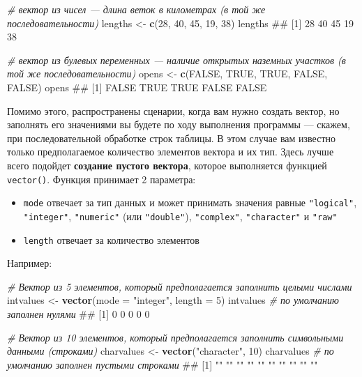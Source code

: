 \documentclass[]{book}
\newenvironment{Shaded}{\begin{snugshade}}{\end{snugshade}}
\newcommand{\KeywordTok}[1]{\textcolor[rgb]{0.13,0.29,0.53}{\textbf{#1}}}
\newcommand{\DataTypeTok}[1]{\textcolor[rgb]{0.13,0.29,0.53}{#1}}
\newcommand{\DecValTok}[1]{\textcolor[rgb]{0.00,0.00,0.81}{#1}}
\newcommand{\StringTok}[1]{\textcolor[rgb]{0.31,0.60,0.02}{#1}}
\newcommand{\CommentTok}[1]{\textcolor[rgb]{0.56,0.35,0.01}{\textit{#1}}}
\newcommand{\OtherTok}[1]{\textcolor[rgb]{0.56,0.35,0.01}{#1}}
\newcommand{\NormalTok}[1]{#1}
\providecommand{\tightlist}{%
  \setlength{\itemsep}{0pt}\setlength{\parskip}{0pt}}
\begin{document}
\begin{Shaded}
\begin{Highlighting}[]
\CommentTok{# вектор из чисел — длина веток в километрах (в той же последовательности)}
\NormalTok{lengths <-}\StringTok{ }\KeywordTok{c}\NormalTok{(}\DecValTok{28}\NormalTok{, }\DecValTok{40}\NormalTok{, }\DecValTok{45}\NormalTok{, }\DecValTok{19}\NormalTok{, }\DecValTok{38}\NormalTok{)}
\NormalTok{lengths}
\NormalTok{## [1] 28 40 45 19 38}
\end{Highlighting}
\end{Shaded}

\begin{Shaded}
\begin{Highlighting}[]
\CommentTok{# вектор из булевых переменных — наличие  открытых наземных участков (в той же последовательности)}
\NormalTok{opens <-}\StringTok{ }\KeywordTok{c}\NormalTok{(}\OtherTok{FALSE}\NormalTok{, }\OtherTok{TRUE}\NormalTok{, }\OtherTok{TRUE}\NormalTok{, }\OtherTok{FALSE}\NormalTok{, }\OtherTok{FALSE}\NormalTok{)}
\NormalTok{opens}
\NormalTok{## [1] FALSE  TRUE  TRUE FALSE FALSE}
\end{Highlighting}
\end{Shaded}

Помимо этого, распространены сценарии, когда вам нужно создать вектор,
но заполнять его значениями вы будете по ходу выполнения программы ---
скажем, при последовательной обработке строк таблицы. В этом случае вам
известно только предполагаемое количество элементов вектора и их тип.
Здесь лучше всего подойдет \textbf{создание пустого вектора}, которое
выполняется функцией \texttt{vector()}. Функция принимает 2 параметра:

\begin{itemize}
\tightlist
\item
  \texttt{mode} отвечает за тип данных и может принимать значения равные
  \texttt{"logical"}, \texttt{"integer"}, \texttt{"numeric"} (или
  \texttt{"double"}), \texttt{"complex"}, \texttt{"character"} и
  \texttt{"raw"}
\item
  \texttt{length} отвечает за количество элементов
\end{itemize}

Например:

\begin{Shaded}
\begin{Highlighting}[]
\CommentTok{# Вектор из 5 элементов, который предполагается заполнить целыми числами}
\NormalTok{intvalues <-}\StringTok{ }\KeywordTok{vector}\NormalTok{(}\DataTypeTok{mode =} \StringTok{"integer"}\NormalTok{, }\DataTypeTok{length =} \DecValTok{5}\NormalTok{)}
\NormalTok{intvalues }\CommentTok{# по умолчанию заполнен нулями}
\NormalTok{## [1] 0 0 0 0 0}

\CommentTok{# Вектор из 10 элементов, который предполагается заполнить символьными данными (строками)}
\NormalTok{charvalues <-}\StringTok{ }\KeywordTok{vector}\NormalTok{(}\StringTok{"character"}\NormalTok{, }\DecValTok{10}\NormalTok{)}
\NormalTok{charvalues }\CommentTok{# по умолчанию заполнен пустыми строками}
\NormalTok{##  [1] "" "" "" "" "" "" "" "" "" ""}
\end{Highlighting}
\end{Shaded}
\end{document}
